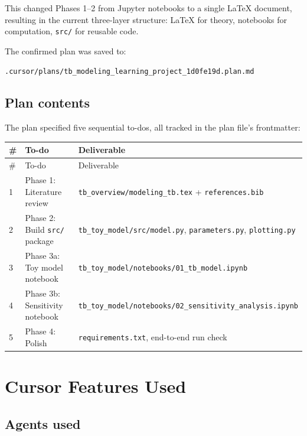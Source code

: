 \documentclass[11pt]{article}
\begin{document}
\noindent This changed Phases 1--2 from Jupyter notebooks to a single LaTeX document, resulting in the current three-layer structure: \LaTeX{} for theory, notebooks for computation, \texttt{src/} for reusable code.

The confirmed plan was saved to:
\begin{center}
\texttt{.cursor/plans/tb\_modeling\_learning\_project\_1d0fe19d.plan.md}
\end{center}

\subsection{Plan contents}

The plan specified five sequential to-dos, all tracked in the plan file's frontmatter:

\begin{longtable}{@{}p{0.4cm}p{4.8cm}p{8.1cm}@{}}
\toprule
\# & To-do & Deliverable \\
\midrule
\endfirsthead
\toprule
\# & To-do & Deliverable \\
\midrule
\endhead
1 & Phase 1: Literature review & \texttt{tb\_overview/modeling\_tb.tex} + \texttt{references.bib} \\
2 & Phase 2: Build \texttt{src/} package & \texttt{tb\_toy\_model/src/model.py}, \texttt{parameters.py}, \texttt{plotting.py} \\
3 & Phase 3a: Toy model notebook & \texttt{tb\_toy\_model/notebooks/01\_tb\_model.ipynb} \\
4 & Phase 3b: Sensitivity notebook & \texttt{tb\_toy\_model/notebooks/02\_sensitivity\_analysis.ipynb} \\
5 & Phase 4: Polish & \texttt{requirements.txt}, end-to-end run check \\
\bottomrule
\end{longtable}

\section{Cursor Features Used}

\subsection{Agents used}
\end{document}
